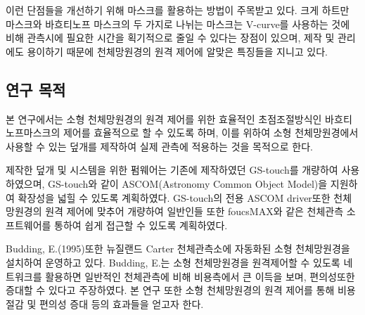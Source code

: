 이런 단점들을 개선하기 위해 마스크를 활용하는 방법이 주목받고 있다. 크게 하트만 마스크와 바흐티노프 마스크의 두 가지로 나뉘는 마스크는 V-curve를 사용하는 것에 비해 관측시에 필요한 시간을 획기적으로 줄일 수 있다는 장점이 있으며, 제작 및 관리에도 용이하기 때문에 천체망원경의 원격 제어에 알맞은 특징들을 지니고 있다.





\subsection{연구 목적}

본 연구에서는 소형 천체망원경의 원격 제어를 위한 효율적인 초점조절방식인 바흐티노프마스크의 제어를 효율적으로 할 수 있도록 하며, 이를 위하여 소형 천체망원경에서 사용할 수 있는 덮개를 제작하여 실제 관측에 적용하는 것을 목적으로 한다. 


제작한 덮개 및 시스템을 위한 펌웨어는 기존에 제작하였던 GS-touch를 개량하여 사용하였으며, GS-touch와 같이 ASCOM(Astronomy Common Object Model)을 지원하여 확장성을 넓힐 수 있도록 계획하였다. GS-touch의 전용 ASCOM driver또한 천체망원경의 원격 제어에 맞추어 개량하여 일반인들 또한 foucsMAX와 같은 천체관측 소프트웨어를 통하여 쉽게 접근할 수 있도록 계획하였다.

\begin{comment}
이를 위해 해결해야 할 주요 문제는 다음과 같다.

\begin{itemize}
	
	\item{덮개는 바흐티노프 마스크를 정확하게 제어할 수 있는가?}\\[-34pt]
	\item{바흐티노프 마스크를 이용하여 초점을 정확하게 맞출 수 있는가?}\\[-34pt]
	\item{향상된 모터포커서를 이용하여 이들을 제어할 수 있는가?}
	
\end{itemize}
\end{comment}

Budding, E.(1995)또한 뉴질랜드 Carter 천체관측소에 자동화된 소형 천체망원경을 설치하여 운영하고 있다. Budding, E.는 소형 천체망원경을 원격제어할 수 있도록 네트워크를 활용하면 일반적인 천체관측에 비해 비용측에서 큰 이득을 보며, 편의성또한 증대할 수 있다고 주장하였다.\cite{budding1995global} 본 연구 또한 소형 천체망원경의 원격 제어를 통해 비용절감 및 편의성 증대 등의 효과들을 얻고자 한다.

